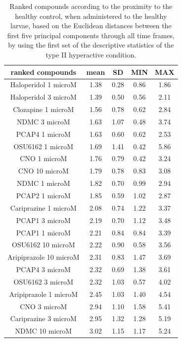 \documentclass[a4paper,12pt]{article}
\begin{document}
\begin{table}[h!]\tiny
\centering
\caption{Ranked compounds according to the proximity to the healthy control, when administered to the healthy larvae, based on the Euclidean distances between the first five principal components through all time frames, by using the first set of the descriptive statistics of the type II hyperactive condition.}
\begin{tabular}{|c|c|c|c|c|}
\hline
ranked compounds             & mean & SD   & MIN  & MAX   \\ \hline
Haloperidol 1 microM   & 1.38 & 0.28 & 0.86 & 1.86 \\ \hline
Haloperidol 3 microM   & 1.39 & 0.50  & 0.56 & 2.11 \\ \hline
Clozapine 1 microM     & 1.56 & 0.78 & 0.62 & 2.84 \\ \hline
NDMC 3 microM          & 1.63 & 1.07 & 0.48 & 3.74 \\ \hline
PCAP4 1 microM       & 1.63 & 0.60  & 0.62 & 2.53 \\ \hline
OSU6162 1 microM       & 1.69 & 1.41 & 0.42 & 5.86 \\ \hline
CNO 1 microM           & 1.76 & 0.79 & 0.42 & 3.24 \\ \hline
CNO 10 microM          & 1.79 & 0.78 & 0.83 & 3.08 \\ \hline
NDMC 1 microM          & 1.82 & 0.70  & 0.99 & 2.94 \\ \hline
PCAP2 1 microM         & 1.85 & 0.59 & 1.02 & 2.87 \\ \hline
Cariprazine 1 microM   & 2.08 & 0.74 & 1.22 & 3.37 \\ \hline
PCAP1 3 microM         & 2.19 & 0.70  & 1.12 & 3.48 \\ \hline
PCAP1 1 microM         & 2.21 & 0.84 & 0.84 & 3.39 \\ \hline
OSU6162 10 microM      & 2.22 & 0.90  & 0.58 & 3.56 \\ \hline
Aripiprazole 10 microM & 2.31 & 0.83 & 1.47 & 3.69 \\ \hline
PCAP4 3 microM       & 2.32 & 0.69 & 1.38 & 3.61 \\ \hline
OSU6162 3 microM       & 2.32 & 1.03 & 0.57 & 4.02 \\ \hline
Aripiprazole 1 microM  & 2.45 & 1.03 & 1.40  & 4.54 \\ \hline
CNO 3 microM           & 2.94 & 1.10  & 1.58 & 5.41 \\ \hline
Cariprazine 3 microM   & 2.95 & 1.32 & 1.28 & 5.19 \\ \hline
NDMC 10 microM         & 3.02 & 1.15 & 1.17 & 5.24 \\ \hline

\end{tabular}
\end{table}
\end{document}
